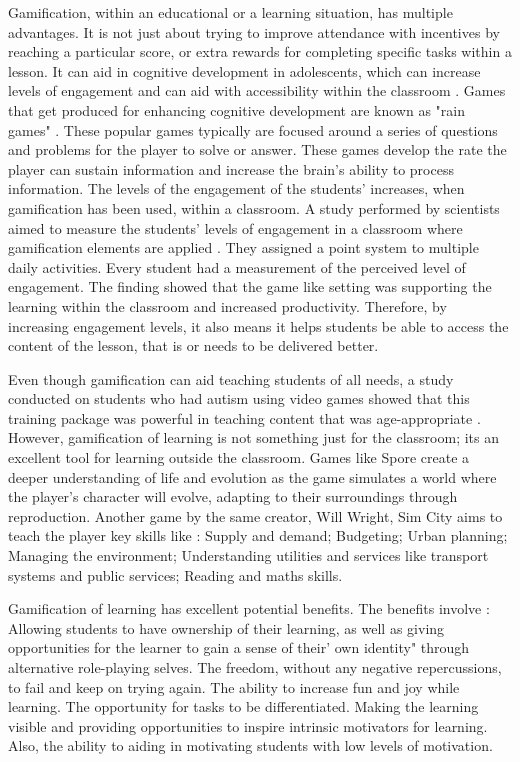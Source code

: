 	Gamification, within an educational or a learning situation, has multiple advantages. It is not just about trying to improve attendance with incentives by reaching a particular score, or extra rewards for completing specific tasks within a lesson. It can aid in cognitive development in adolescents, which can increase levels of engagement and can aid with accessibility within the classroom \cite{24}. Games that get produced for enhancing cognitive development are known as "rain games" \cite{24}. These popular games typically are focused around a series of questions and problems for the player to solve or answer. These games develop the rate the player can sustain information and increase the brain's ability to process information. The levels of the engagement of the students' increases, when gamification has been used, within a classroom. A study performed by scientists aimed to measure the students' levels of engagement in a classroom where gamification elements are applied \cite{25}. They assigned a point system to multiple daily activities. Every student had a measurement of the perceived level of engagement. The finding showed that the game like setting was supporting the learning within the classroom and increased productivity. Therefore, by increasing engagement levels, it also means it helps students be able to access the content of the lesson, that is or needs to be delivered better. 
	
	Even though gamification can aid teaching students of all needs, a study conducted on students who had autism using video games showed that this training package was powerful in teaching content that was age-appropriate \cite{26}. However, gamification of learning is not something just for the classroom; its an excellent tool for learning outside the classroom. Games like Spore create a deeper understanding of life and evolution as the game simulates a world where the player's character will evolve, adapting to their surroundings through reproduction. Another game by the same creator, Will Wright, Sim City aims to teach the player key skills like \cite{27}: Supply and demand; Budgeting; Urban planning; Managing the environment; Understanding utilities and services like transport systems and public services; Reading and maths skills. 
	
	Gamification of learning has excellent potential benefits. The benefits involve \cite{22}: Allowing students to have ownership of their learning, as well as giving opportunities for the learner to gain a sense of their' own identity" through alternative role-playing selves. The freedom, without any negative repercussions, to fail and keep on trying again. The ability to increase fun and joy while learning. The opportunity for tasks to be differentiated. Making the learning visible and providing opportunities to inspire intrinsic motivators for learning. Also, the ability to aiding in motivating students with low levels of motivation. %
	
